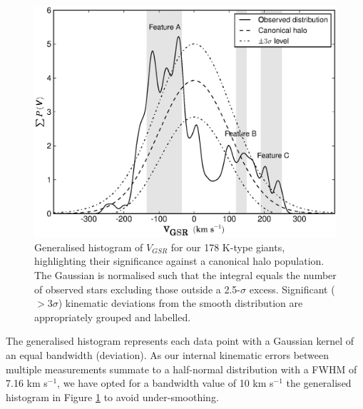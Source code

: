 \documentclass[preprint2]{aastex}
\begin{document}
	\begin{figure}[h!]
		\includegraphics[width=\columnwidth]{./figures/velocity-halo.eps}
		\caption{Generalised histogram of $V_{GSR}$ for our 178 K-type giants, highlighting their significance against a canonical halo population. The Gaussian is normalised such that the integral equals the number of observed stars excluding those outside a 2.5-$\sigma$ excess. Significant ($>3\sigma$) kinematic deviations from the smooth distribution are appropriately grouped and labelled.}
		\label{fig:velocity-histogram}
	\end{figure}
	
The generalised histogram represents each data point with a Gaussian kernel of an equal bandwidth (deviation). As our internal kinematic errors between multiple measurements summate to a half-normal distribution with a FWHM of 7.16 km s$^{-1}$, we have opted for a bandwidth value of 10 km s$^{-1}$ the generalised histogram in Figure \ref{fig:velocity-histogram} to avoid under-smoothing.
\end{document}
